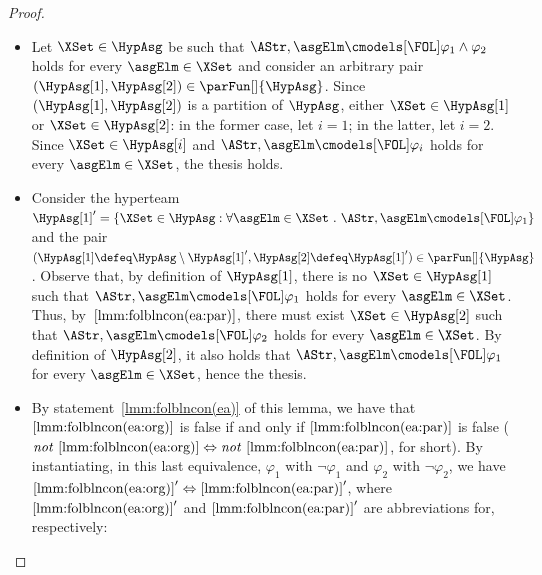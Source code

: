 \documentclass[authoryear]{elsarticle}
\begin{document}
\lmmfolblncon*
%
\begin{proof}

\begin{itemize}
\item[($\ref{lmm:folblncon(ea:org)} \Rightarrow \ref{lmm:folblncon(ea:par)}$)]
%
%
  Let $\XSet \in \HypAsg$ be such that $\AStr, \asgElm \cmodels[\FOL]
  \varphi_{1} \wedge \varphi_{2}$ holds for every $\asgElm \in \XSet$ and
  consider an arbitrary pair $(\HypAsg[1], \HypAsg[2]) \in \parFun[]{\HypAsg}$.
  Since $(\HypAsg[1], \HypAsg[2])$ is a partition of $\HypAsg$, either $\XSet
  \in \HypAsg[1]$ or $\XSet \in \HypAsg[2]$: in the former case, let $i=1$; in
  the latter, let $i = 2$.
  Since $\XSet \in \HypAsg[i]$ and $\AStr, \asgElm \cmodels[\FOL] \varphi_{i} $
  holds for every $\asgElm \in \XSet$, the thesis holds.

\item[($\ref{lmm:folblncon(ea:par)} \Rightarrow \ref{lmm:folblncon(ea:org)}$)]
  Consider the hyperteam $\HypAsg[1]' = \{ \XSet \in \HypAsg : \forall
  \asgElm \in \XSet \ . \ \AStr, \asgElm \cmodels[\FOL] \varphi_1 \}$ and the
  pair $(\HypAsg[1] \defeq \HypAsg \setminus \HypAsg[1]', \HypAsg[2] \defeq
  \HypAsg[1]') \in \parFun[]{\HypAsg}$.
  Observe that, by definition of $\HypAsg[1]$, there is no $\XSet \in
  \HypAsg[1]$ such that $\AStr, \asgElm \cmodels[\FOL] \varphi_{1}$ holds for
  every $\asgElm \in \XSet$.
  Thus, by~$\ref{lmm:folblncon(ea:par)}$, there must exist $\XSet \in
  \HypAsg[2]$ such that $\AStr, \asgElm \cmodels[\FOL] \varphi_{2}$ holds for
  every $\asgElm \in \XSet$.
  By definition of $\HypAsg[2]$, it also holds that $\AStr, \asgElm
  \cmodels[\FOL] \varphi_{1}$ for every $\asgElm \in \XSet$, hence the thesis.

\item[($\ref{lmm:folblncon(ae:org)} \Leftrightarrow
  \ref{lmm:folblncon(ae:org)}$)] By statement~\ref{lmm:folblncon(ea)} of this
  lemma, we have that $\ref{lmm:folblncon(ea:org)}$ is false if and only if
  $\ref{lmm:folblncon(ea:par)}$ is false ($\mathit{not} \
  \ref{lmm:folblncon(ea:org)} \Leftrightarrow \mathit{not} \
  \ref{lmm:folblncon(ea:par)}$, for short).
  By instantiating, in this last equivalence, $\varphi_1$ with $\neg\varphi_1$
  and $\varphi_2$ with $\neg\varphi_2$, we have $\ref{lmm:folblncon(ea:org)}'
  \Leftrightarrow \ref{lmm:folblncon(ea:par)}'$, where
  $\ref{lmm:folblncon(ea:org)}'$ and $\ref{lmm:folblncon(ea:par)}'$ are
  abbreviations for, respectively:


\end{itemize}
\end{proof}
\end{document}
